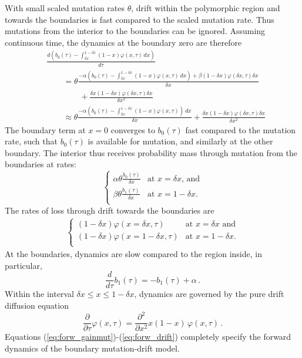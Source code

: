 \documentclass[preprint]{elsarticle}
\begin{document}
{With small scaled mutation rates $\theta$, drift within the polymorphic region and towards the boundaries is fast compared to the scaled mutation rate. Thus mutations from the interior to the boundaries can be ignored. Assuming continuous time, the dynamics at the boundary zero are therefore
\begin{equation}
\begin{split}
    &\frac{d (b_0(\tau)-\int_{\delta x}^{1-\delta x}(1-x)\varphi(x,\tau)\,d x)}{d\tau} \\
    &\qquad=\theta \frac{-\alpha(b_0(\tau)-\int_{\delta x}^{1-\delta x}(1-x)\varphi(x,\tau)\,dx)+\beta(1-\delta x)\varphi(\delta x,\tau)\delta x}{\delta x}\\
    &\qquad\qquad+\frac{\delta x (1-\delta x)\varphi(\delta x,\tau)\delta x}{\delta x^2} \\   
    &\qquad\approx \theta \frac{-\alpha(b_0(\tau)-\int_{\delta x}^{1-\delta x}(1-x)\varphi(x,\tau))\,dx}{\delta x}+\frac{\delta x (1-\delta x)\varphi(\delta x,\tau)\delta x}{\delta x^2}    
\end{split}
\end{equation}
The boundary term at $x=0$ converges to $b_0(\tau)$ fast compared to the mutation rate, such that $b_0(\tau)$ is available for mutation, and similarly at the other boundary. The interior thus receives probability mass through mutation from the boundaries at rates:
\begin{equation}\label{eq:forw_gainmut}
\begin{cases}
\alpha\theta \frac{b_0(\tau)}{\delta x} &\text{at $x=\delta x$, and}\\
\beta\theta\frac{b_1(\tau)}{\delta x} &\text{at $x=1-\delta x$.}\\
\end{cases}
\end{equation}
The rates of loss through drift towards the boundaries are
\begin{align}\label{eq:forw_lossdrift}
  \begin{cases}
    (1-\delta x)\varphi(x=\delta x,\tau) &\text{at $x=\delta x$ and}\\
    (1-\delta x)\varphi(x=1-\delta x,\tau) &\text{at $x=1-\delta x$.}\\
\end{cases}
\end{align}
At the boundaries, dynamics are slow compared to the region inside, in particular, 
\begin{equation}\label{eq:forw_boundaries}
    \frac{d}{d\tau}b_1(\tau)=-b_1(\tau)+\alpha\,.
\end{equation}
Within the interval $\delta x\leq x \leq 1-\delta x$, dynamics are governed by the pure drift diffusion equation
\begin{equation}\label{eq:forw_drift}
  \frac{\partial}{\partial \tau} \varphi(x,\tau) =\frac{\partial^2}{\partial x^2}x(1-x)\,\varphi(x,\tau)\,.  
\end{equation}
Equations (\ref{eq:forw_gainmut})-(\ref{eq:forw_drift}) completely specify the forward dynamics of the boundary mutation-drift model.

}
\end{document}
